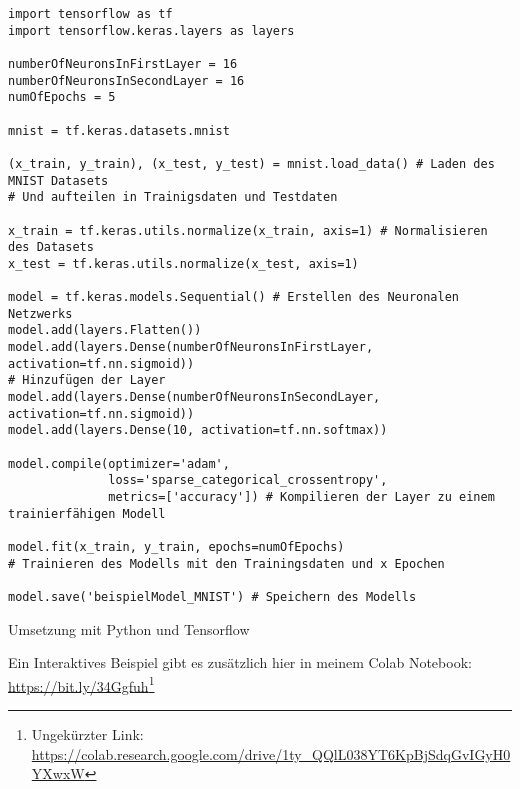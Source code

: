 \begin{listing}[H]
    \begin{verbatim}
import tensorflow as tf
import tensorflow.keras.layers as layers

numberOfNeuronsInFirstLayer = 16 
numberOfNeuronsInSecondLayer = 16 
numOfEpochs = 5 

mnist = tf.keras.datasets.mnist

(x_train, y_train), (x_test, y_test) = mnist.load_data() # Laden des MNIST Datasets
# Und aufteilen in Trainigsdaten und Testdaten

x_train = tf.keras.utils.normalize(x_train, axis=1) # Normalisieren des Datasets
x_test = tf.keras.utils.normalize(x_test, axis=1)

model = tf.keras.models.Sequential() # Erstellen des Neuronalen Netzwerks
model.add(layers.Flatten())
model.add(layers.Dense(numberOfNeuronsInFirstLayer, activation=tf.nn.sigmoid))
# Hinzufügen der Layer
model.add(layers.Dense(numberOfNeuronsInSecondLayer, activation=tf.nn.sigmoid))
model.add(layers.Dense(10, activation=tf.nn.softmax))

model.compile(optimizer='adam',
              loss='sparse_categorical_crossentropy',
              metrics=['accuracy']) # Kompilieren der Layer zu einem trainierfähigen Modell

model.fit(x_train, y_train, epochs=numOfEpochs)
# Trainieren des Modells mit den Trainingsdaten und x Epochen

model.save('beispielModel_MNIST') # Speichern des Modells

    \end{verbatim}
    \caption{Umsetzung mit Python und Tensorflow}
\end{listing}
Ein Interaktives Beispiel gibt es zusätzlich hier in meinem Colab Notebook: \url{https://bit.ly/34Ggfuh}\footnote{Ungekürzter Link: \url{https://colab.research.google.com/drive/1ty_QQlL038YT6KpBjSdqGvIGyH0YXwxW}}
